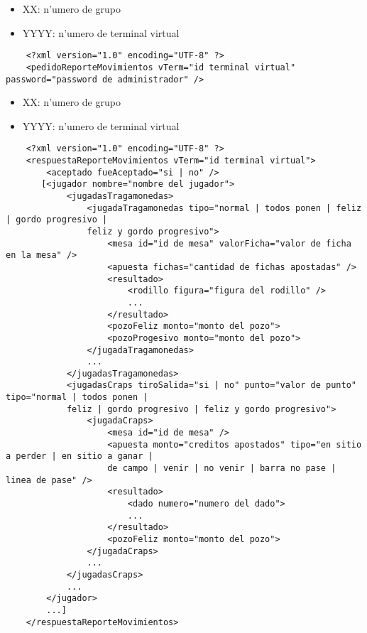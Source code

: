 
\begin{itemize}
    \item{XX: n'umero de grupo}
    \item{YYYY: n'umero de terminal virtual}
\end{itemize}

\begin{verbatim}
    <?xml version="1.0" encoding="UTF-8" ?>
    <pedidoReporteMovimientos vTerm="id terminal virtual" password="password de administrador" />
\end{verbatim}


 
\begin{itemize}
    \item{XX: n'umero de grupo}
    \item{YYYY: n'umero de terminal virtual}
\end{itemize}

\begin{verbatim}
    <?xml version="1.0" encoding="UTF-8" ?>
    <respuestaReporteMovimientos vTerm="id terminal virtual">
        <aceptado fueAceptado="si | no" />
       [<jugador nombre="nombre del jugador">
            <jugadasTragamonedas>
                <jugadaTragamonedas tipo="normal | todos ponen | feliz | gordo progresivo |
                feliz y gordo progresivo">
                    <mesa id="id de mesa" valorFicha="valor de ficha en la mesa" />
                    <apuesta fichas="cantidad de fichas apostadas" />
                    <resultado>
                        <rodillo figura="figura del rodillo" />
                        ...
                    </resultado>
                    <pozoFeliz monto="monto del pozo">
                    <pozoProgesivo monto="monto del pozo">
                </jugadaTragamonedas>
                ...
            </jugadasTragamonedas>
            <jugadasCraps tiroSalida="si | no" punto="valor de punto" tipo="normal | todos ponen |
            feliz | gordo progresivo | feliz y gordo progresivo">
                <jugadaCraps>
                    <mesa id="id de mesa" />
                    <apuesta monto="creditos apostados" tipo="en sitio a perder | en sitio a ganar |
                    de campo | venir | no venir | barra no pase | linea de pase" />
                    <resultado>
                        <dado numero="numero del dado">
                        ...
                    </resultado>
                    <pozoFeliz monto="monto del pozo">
                </jugadaCraps>
                ...
            </jugadasCraps>
            ...
        </jugador>
        ...]
    </respuestaReporteMovimientos>
\end{verbatim}


